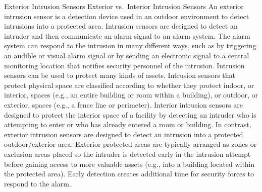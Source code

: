 \documentclass{article}
\begin{document}
Exterior Intrusion Sensors Exterior vs.~Interior Intrusion Sensors An
exterior intrusion sensor is a detection device used in an outdoor
environment to detect intrusions into a protected area. Intrusion
sensors are designed to detect an intruder and then communicate an alarm
signal to an alarm system. The alarm system can respond to the intrusion
in many different ways, such as by triggering an audible or visual alarm
signal or by sending an electronic signal to a central monitoring
location that notifies security personnel of the intrusion. Intrusion
sensors can be used to protect many kinds of assets. Intrusion sensors
that protect physical space are classified according to whether they
protect indoor, or interior, spaces (e.g., an entire building or room
within a building), or outdoor, or exterior, spaces (e.g., a fence line
or perimeter). Interior intrusion sensors are designed to protect the
interior space of a facility by detecting an intruder who is attempting
to enter or who has already entered a room or building. In contrast,
exterior intrusion sensors are designed to detect an intrusion into a
protected outdoor/exterior area. Exterior protected areas are typically
arranged as zones or exclusion areas placed so the intruder is detected
early in the intrusion attempt before gaining access to more valuable
assets (e.g., into a building located within the protected area). Early
detection creates additional time for security forces to respond to the
alarm.
\end{document}
